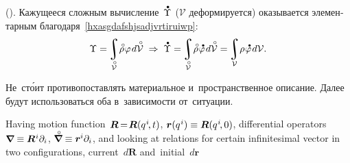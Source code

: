 \begin{otherlanguage}{russian}
\vspace{-0.25em}\noindent (). Кажущееся сложным вычисление~${\mathdotabove{\Upsilon}}$ ($\mathcal{V}$ деформируется) оказывается элементарным благодаря~\eqref{hxasgdafshjsadjvrtiruiwp}:
\begin{equation}\label{volumeintegralinbothconfigurations}
\Upsilon = \hspace{-0.2ex} \integral\displaylimits_{\mathcircabove{\mathcal{V}}} \! \mathcircabove{\rho} \hspace{0.1ex} \varphi \hspace{0.2ex} d\mathcircabove{\mathcal{V}}
\;\Rightarrow\;
\mathdotabove{\Upsilon} = \hspace{-0.2ex} \integral\displaylimits_{\mathcircabove{\mathcal{V}}} \! \mathcircabove{\rho} \hspace{0.1ex} \mathdotabove{\varphi} \hspace{0.2ex} d\mathcircabove{\mathcal{V}} =
\hspace{-0.2ex} \integral\displaylimits_{\mathcal{V}} \! \rho \hspace{0.1ex} \mathdotabove{\varphi} \hspace{0.2ex} d\mathcal{V} .
\end{equation}

\vspace{-0.1em} Не~ст\'{о}ит противопоставлять материальное и~пространственное описание. Далее будут использоваться оба в~зависимости от~ситуации.

\end{otherlanguage}

\newpage



\label{para:motiongradient}

Having motion function~${\bm{R} \hspace{-0.25ex} = \hspace{-0.4ex} \bm{R}(q^{\hspace{.1ex}i} \hspace{-0.3ex}, t)}$, ${\bm{r}(q^{\hspace{.1ex}i}) \equiv \bm{R}(q^{\hspace{.1ex}i} \hspace{-0.3ex}, 0)}$, differential  operators ${\bm{\nabla}\hspace{-0.2ex} \equiv \bm{R}^{\hspace{.1ex}i} \partial_i}$, ${\boldnablacircled \equiv \bm{r}^{\hspace{-0.05ex}i} \partial_i}$, and looking at relations for certain infinitesimal vector in two configurations, current~${d\bm{R}}$ and~initial~${d\bm{r}}$


